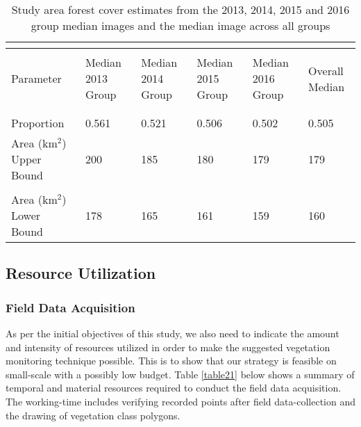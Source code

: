 \begin{ThreePartTable}
	\centering
	\small
	\def\arraystretch{1.3}
	\begin{longtable}{L{1.9cm} L{2.3cm} L{2.3cm} L{2.3cm} L{2.3cm} L{2.4cm}}
		\caption{Study area forest cover estimates from the 2013, 2014, 2015 and 2016 group median images and the median image across all groups}
		\hskip25pt	
		\label{table20}\\
		\toprule[0.25mm]\\[-0.5cm]
		Parameter & Median 2013 Group & Median 2014 Group&  Median 2015 Group &  Median 2016 Group &  Overall Median \\\\[-0.5cm]
		\midrule[0.35mm]\\[-0.4cm]
		Proportion & 0.561 & 0.521& 0.506 & 0.502 & 0.505\\[0.3cm]
		Area (km$^2$) Upper Bound & 200 & 185 & 180 & 179 & 179 \\\\[-0.4cm]
		Area (km$^2$) Lower Bound & 178 & 165 & 161  & 159 & 160\\[0.05cm]
		\bottomrule[0.25mm]
	\end{longtable}
\end{ThreePartTable}

\subsection{Resource Utilization}

\subsubsection{Field Data Acquisition}

\justify
As per the initial objectives of this study, we also need to indicate the amount and intensity of resources utilized in order to make the suggested vegetation monitoring technique possible. This is to show that our strategy is feasible on small-scale with a possibly low budget. Table \ref{table21} below shows a summary of temporal and material resources required to conduct the field data acquisition. The working-time includes verifying recorded points after field data-collection and the drawing of vegetation class polygons.

